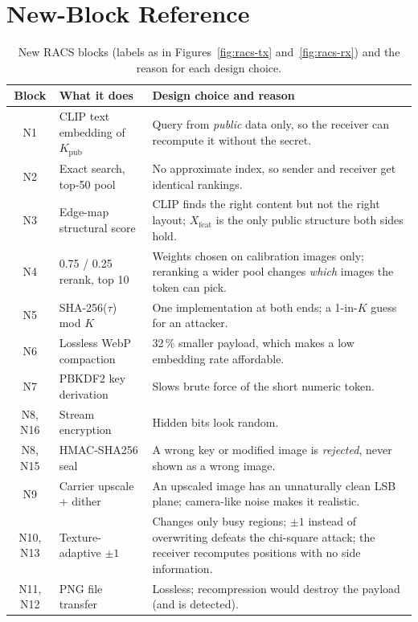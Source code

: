 \section{New-Block Reference}
\begin{table}[!htbp]
	\centering
	\caption{New RACS blocks (labels as in Figures~\ref{fig:racs-tx} and~\ref{fig:racs-rx}) and the reason for each design choice.}
	\label{tab:newblocks}
	\begin{tabularx}{\textwidth}{|c|l|X|}
		\hline
		\textbf{Block} & \textbf{What it does} & \textbf{Design choice and reason} \\ \hline
		N1 & CLIP text embedding of $K_{\mathrm{pub}}$ & Query from \emph{public} data only, so the receiver can recompute it without the secret. \\ \hline
		N2 & Exact search, top-50 pool & No approximate index, so sender and receiver get identical rankings. \\ \hline
		N3 & Edge-map structural score & CLIP finds the right content but not the right layout; $X_{\mathrm{feat}}$ is the only public structure both sides hold. \\ \hline
		N4 & 0.75 / 0.25 rerank, top 10 & Weights chosen on calibration images only; reranking a wider pool changes \emph{which} images the token can pick. \\ \hline
		N5 & SHA-256($\tau$) mod $K$ & One implementation at both ends; a 1-in-$K$ guess for an attacker. \\ \hline
		N6 & Lossless WebP compaction & 32\,\% smaller payload, which makes a low embedding rate affordable. \\ \hline
		N7 & PBKDF2 key derivation \cite{rfc8018} & Slows brute force of the short numeric token. \\ \hline
		N8, N16 & Stream encryption \cite{fips202} & Hidden bits look random. \\ \hline
		N8, N15 & HMAC-SHA256 seal \cite{rfc2104} & A wrong key or modified image is \emph{rejected}, never shown as a wrong image. \\ \hline
		N9 & Carrier upscale + dither & An upscaled image has an unnaturally clean LSB plane; camera-like noise makes it realistic. \\ \hline
		N10, N13 & Texture-adaptive $\pm1$ & Changes only busy regions; $\pm1$ instead of overwriting defeats the chi-square attack; the receiver recomputes positions with no side information. \\ \hline
		N11, N12 & PNG file transfer & Lossless; recompression would destroy the payload (and is detected). \\ \hline
	\end{tabularx}
\end{table}

